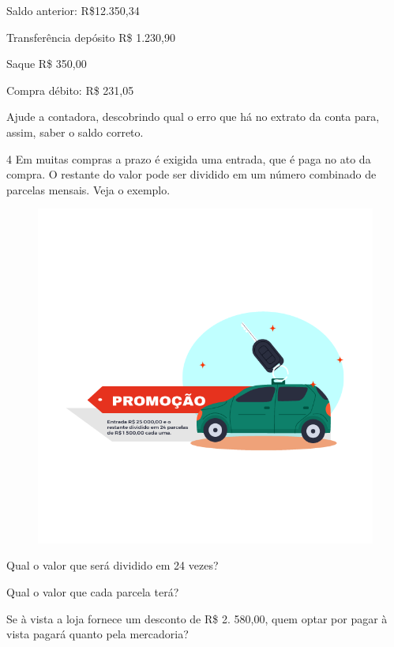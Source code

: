 Saldo anterior: R\$12.350,34

Transferência depósito R\$ 1.230,90

Saque R\$ 350,00

Compra débito: R\$ 231,05

Ajude a contadora, descobrindo qual o erro que há no extrato da conta para, assim, saber o saldo correto.



\num{4} Em muitas compras a prazo é exigida uma entrada, que é paga no ato
da compra. O restante do valor pode ser dividido em um número combinado
de parcelas mensais. Veja o exemplo.

\begin{figure}[htpb!]
\includegraphics[width=\textwidth]{../ilustracoes/MAT5/SAEB_5ANO_MAT_figura50.png}
\end{figure}

\begin{escolha}
\item
  Qual o valor que será dividido em 24 vezes?


\item
  Qual o valor que cada parcela terá?


\item
  Se à vista a loja fornece um desconto de R\$ 2. 580,00, quem optar por
  pagar à vista pagará quanto pela mercadoria?

\end{escolha}

